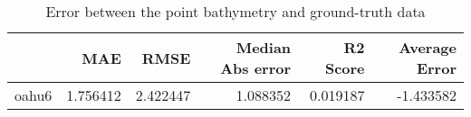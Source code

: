 \begin{table}[h!]
\caption{Error between the point bathymetry and ground-truth data}
\label{tab:oahu6_lidar_error}
\begin{tabular}{lrrrrr}
\toprule
 & MAE & RMSE & Median Abs error & R2 Score & Average Error \\
\midrule
oahu6 & 1.756412 & 2.422447 & 1.088352 & 0.019187 & -1.433582 \\
\bottomrule
\end{tabular}
\end{table}
